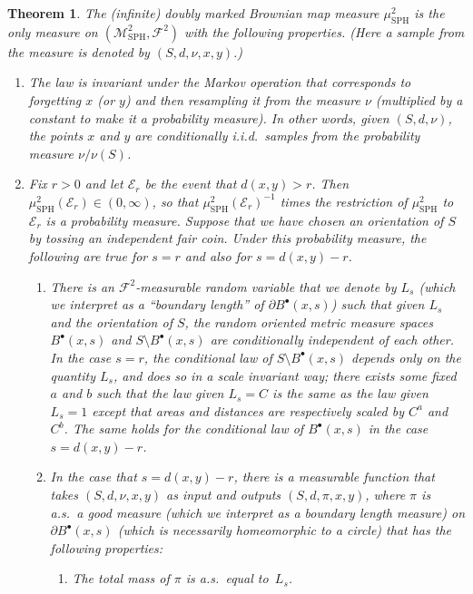 \documentclass[10pt]{amsart}
\let\mathcal\mathscr
\newcommand{\sbullet}{{\scriptscriptstyle\bullet}}
\theoremstyle{plain}
\newtheorem{theorem}{Theorem}
\numberwithin{theorem}{section}
\theoremstyle{definition}
\newcommand\gmsspace{{\mathcal M}_{\mathrm{SPH}}}
\newcommand\mmsigma{{\mathcal F}}
\newcommand{\mustwo}{\mu_{\mathrm{SPH}}^2}
\newcommand{\fb}[2]{B^\sbullet(#1,#2)}
\begin{document}
\begin{theorem}
\label{thm::markovmapcharacterization}
The (infinite) doubly marked Brownian map measure $\mustwo$ is the only measure on $(\gmsspace^2, \mmsigma^2)$ with the following properties. (Here a sample from the measure is denoted by $(S,d,\nu,x,y)$.)
\begin{enumerate}
\item The law is invariant under the Markov operation that corresponds to forgetting $x$ (or $y$) and then resampling it from the measure $\nu$ (multiplied by a constant to make it a probability measure). In other words, given $(S,d,\nu)$, the points $x$ and $y$ are conditionally i.i.d.\ samples from the probability measure $\nu/\nu(S)$.
\item Fix $r > 0$ and let $\mathcal E_r$ be the event that $d(x,y) > r$. Then $\mustwo(\mathcal E_r) \in (0, \infty)$, so that $\mustwo(\mathcal E_r)^{-1}$ times the restriction of $\mustwo$ to $\mathcal E_r$ is a probability measure. Suppose that we have chosen an orientation of $S$ by tossing an independent fair coin. Under this probability measure, the following are true for $s = r$ and also for $s = d(x,y) - r$.
\begin{enumerate}
\item There is an $\mmsigma^2$-measurable random variable that we denote by $L_s$ (which we interpret as a ``boundary length'' of $\partial \fb{x}{s}$) such that \emph{given} $L_s$ and the orientation of $S$, the random oriented metric measure spaces $\fb{x}{s}$ and \hbox{$S \setminus \fb{x}{s}$} are conditionally independent of each other. In the case $s = r$, the conditional law of $S \setminus \fb{x}{s}$ depends only on the quantity $L_s$, and does so in a scale invariant way; \ie there exists some fixed $a$ and $b$ such that the law given $L_s = C$ is the same as the law given $L_s = 1$ except that areas and distances are respectively scaled by $C^a$ and $C^b$. The same holds for the conditional law of $\fb{x}{s}$ in the case $s = d(x,y)-r$.
\item In the case that $s=d(x,y) - r$, there is a measurable function that takes $(S,d,\nu,x,y)$ as input and outputs $(S,d,\pi,x,y)$, where $\pi$ is a.s.\ a good measure (which we interpret as a \emph{boundary length} measure) on $\partial \fb{x}{s}$ (which is necessarily homeomorphic to a circle) that has the following properties:
\begin{enumerate}\renewcommand{\theenumi}{\roman{enumi}}
\item The total mass of $\pi$ is a.s.\ equal to~$L_s$.

\end{enumerate}
\end{enumerate}
\end{enumerate}
\end{theorem}
\end{document}
